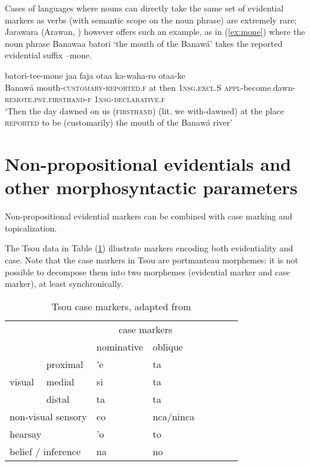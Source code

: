 \documentclass[oneside,a4paper,11pt]{article}
\newcommand{\ipa}[1]{{\phon \mbox{#1}}} %
\begin{document}
Cases of languages where nouns can directly take the same set of evidential markers as verbs (with semantic scope on the noun phrase) are extremely rare; Jarawara (Arawan, \citealt[88, ex 3.19]{aikhenvald06}) however offers such an example, as in (\ref{ex:mone}) where the noun phrase \ipa{Banawaa} \ipa{batori} `the mouth of the Banawá' takes the reported evidential suffix \ipa{--mone}.

\begin{exe}
\ex \label{ex:mone}
\gll  \ipa{Banawaa} \ipa{batori-tee-mone} \ipa{jaa} \ipa{faja} \ipa{otaa} \ipa{ka-waha-ro} \ipa{otaa-ke} \\
Banawá mouth-\textsc{customary-reported.f} at then \textsc{1nsg.excl}.S \textsc{appl}-become.dawn-\textsc{remote.pst.firsthand-f} \textsc{1nsg-declarative.f} \\
\glt ‘Then the day dawned on us (\textsc{firsthand}) (lit. we with-dawned) at the
place \textsc{reported} to be (customarily) the mouth of the Banawá river’
\end{exe}

 \section{Non-propositional evidentials and other morphosyntactic parameters} \label{sec:parameter}
Non-propositional evidential markers  can be combined with    case marking and topicalization.

The Tsou data in Table (\ref{tab:tsou})   illustrate markers encoding both evidentiality and case. Note that the case markers in Tsou are portmanteau morphemes: it is not possible to decompose them into two morphemes (evidential marker and case marker), at least synchronically.  
 
\begin{table}[H]
 \caption{Tsou case markers, adapted from \citet[54]{yang00tsou.case}} \centering \label{tab:tsou}
\begin{tabular}{llllllll}
\toprule
	 & 	 & 	\multicolumn{2}{c}{case markers } 	 \\	
	 & 	 & 	nominative & 	oblique \\	
\midrule
	 & 	proximal & 	\ipa{'e} & 	\ipa{ta} \\ 	
visual	 & 	medial & 	\ipa{si} & 	\ipa{ta}  \\ 	
	 & 	distal & 	\ipa{ta} & 	\ipa{ta}  \\ 	
\multicolumn{2}{l}{non-visual sensory}  	 & 	\ipa{co} & 	\ipa{nca/ninca} \\ 	
	 \midrule
\multicolumn{2}{l}{hearsay}	 & 	\ipa{'o} & 	\ipa{to} \\ 	
\multicolumn{2}{l}{belief / inference} 	 & 	\ipa{na} & 	\ipa{no} \\ 	
\bottomrule
\end{tabular}
\end{table} 
\end{document}
